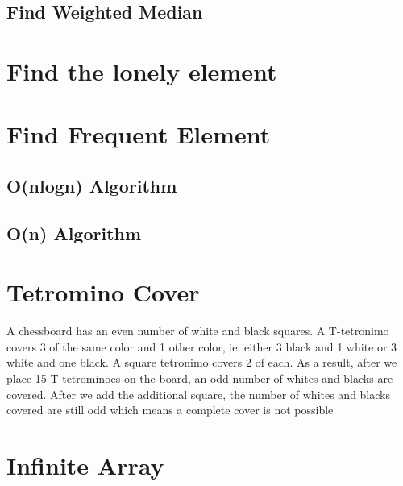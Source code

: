 \documentclass{article}
\begin{document}
        

    \subsection{Find Weighted Median}
    \label{sub:Find Weighted Median}

        

\section{Find the lonely element}
\label{sec:Find the lonely element}

    

\section{Find Frequent Element}
\label{sec:Find Frequent Element}

    \subsection{O(nlogn) Algorithm}
    \label{sub:nlogn Algorithm}

        

    \subsection{O(n) Algorithm}
    \label{sub:nlogn Algorithm}

        

\section{Tetromino Cover}
\label{sec:Tetromino Cover}

    A chessboard has an even number of white and black squares. A T-tetronimo covers 3 of the same color and 1 other color, ie. either 3 black and 1 white or 3 white and one black. A square tetronimo covers 2 of each.
    As a result, after we place 15 T-tetrominoes on the board, an odd number of whites and blacks are covered. After we add the additional square, the number of whites and blacks covered are still odd which means a complete cover is not possible

\section{Infinite Array}
\label{sec:Infinite Array}

    
\end{document}
